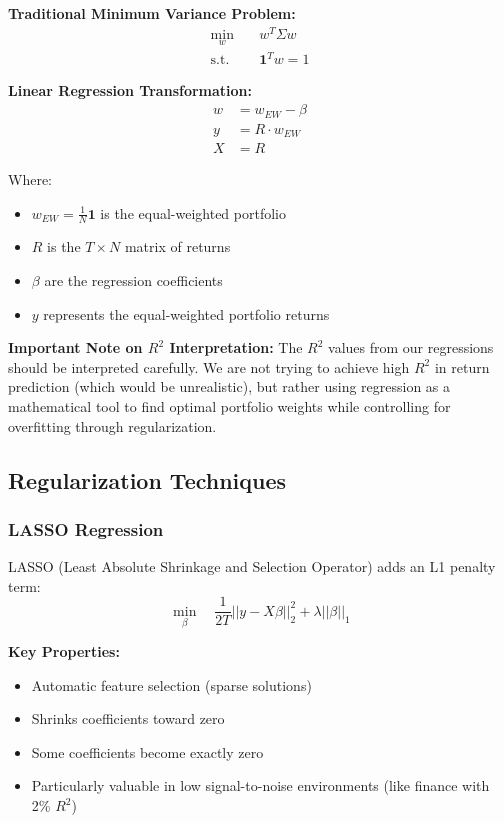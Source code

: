 \documentclass[12pt]{article}
\begin{document}
\textbf{Traditional Minimum Variance Problem:}
\begin{align}
\min_w \quad & w^T \Sigma w \\
\text{s.t.} \quad & \mathbf{1}^T w = 1
\end{align}

\textbf{Linear Regression Transformation:}
\begin{align}
w &= w_{EW} - \beta \\
y &= R \cdot w_{EW} \\
X &= R
\end{align}

Where:
\begin{itemize}
    \item $w_{EW} = \frac{1}{N}\mathbf{1}$ is the equal-weighted portfolio
    \item $R$ is the $T \times N$ matrix of returns
    \item $\beta$ are the regression coefficients
    \item $y$ represents the equal-weighted portfolio returns
\end{itemize}

\textbf{Important Note on $R^2$ Interpretation:} The $R^2$ values from our regressions should be interpreted carefully. We are not trying to achieve high $R^2$ in return prediction (which would be unrealistic), but rather using regression as a mathematical tool to find optimal portfolio weights while controlling for overfitting through regularization.

\subsection{Regularization Techniques}

\subsubsection{LASSO Regression}
LASSO (Least Absolute Shrinkage and Selection Operator) adds an L1 penalty term:
\begin{equation}
\min_\beta \quad \frac{1}{2T} ||y - X\beta||_2^2 + \lambda ||\beta||_1
\end{equation}

\textbf{Key Properties:}
\begin{itemize}
    \item Automatic feature selection (sparse solutions)
    \item Shrinks coefficients toward zero
    \item Some coefficients become exactly zero
    \item Particularly valuable in low signal-to-noise environments (like finance with 2\% $R^2$)
\end{itemize}
\end{document}
